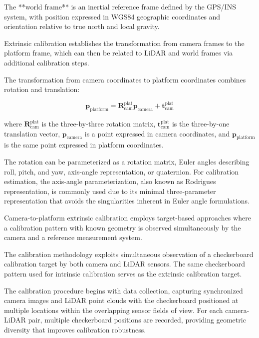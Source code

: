 The **world frame** is an inertial reference frame defined by the GPS/INS system, with position expressed in WGS84 geographic coordinates and orientation relative to true north and local gravity.

Extrinsic calibration establishes the transformation from camera frames to the platform frame, which can then be related to LiDAR and world frames via additional calibration steps.


The transformation from camera coordinates to platform coordinates combines rotation and translation:

\begin{equation}
    \mathbf{p}_{\text{platform}} = \mathbf{R}_{\text{cam}}^{\text{plat}} \mathbf{p}_{\text{camera}} + \mathbf{t}_{\text{cam}}^{\text{plat}}    
\end{equation}


where $\mathbf{R}_{\text{cam}}^{\text{plat}}$ is the three-by-three rotation matrix, $\mathbf{t}_{\text{cam}}^{\text{plat}}$ is the three-by-one translation vector, $\mathbf{p}_{\text{camera}}$ is a point expressed in camera coordinates, and $\mathbf{p}_{\text{platform}}$ is the same point expressed in platform coordinates.

The rotation can be parameterized as a rotation matrix, Euler angles describing roll, pitch, and yaw, axis-angle representation, or quaternion.
For calibration estimation, the axis-angle parameterization, also known as Rodrigues representation, is commonly used due to its minimal three-parameter representation that avoids the singularities inherent in Euler angle formulations.


Camera-to-platform extrinsic calibration employs target-based approaches where a calibration pattern with known geometry is observed simultaneously by the camera and a reference measurement system.


The calibration methodology exploits simultaneous observation of a checkerboard calibration target by both camera and LiDAR sensors.
The same checkerboard pattern used for intrinsic calibration serves as the extrinsic calibration target.

The calibration procedure begins with data collection, capturing synchronized camera images and LiDAR point clouds with the checkerboard positioned at multiple locations within the overlapping sensor fields of view.
For each camera-LiDAR pair, multiple checkerboard positions are recorded, providing geometric diversity that improves calibration robustness.

